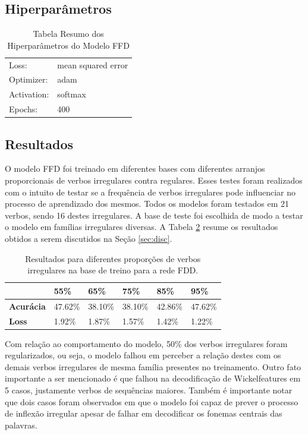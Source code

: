 \subsection{Hiperparâmetros}

\begin{table}[H]
\centering
\begin{tabular}{ll}
Loss: & mean squared error \\
Optimizer: & adam \\
Activation: & softmax \\
Epochs: & 400 \\
\end{tabular}
\caption{Tabela Resumo dos Hiperparâmetros do Modelo FFD}
\label{tab:resumo1}
\end{table}

\subsection{Resultados}

O modelo FFD foi treinado em diferentes bases com diferentes arranjos proporcionais de verbos irregulares contra regulares. Esses testes foram realizados com o intuito de testar se a frequência de verbos irregulares pode influenciar no processo de aprendizado dos mesmos. Todos os modelos foram testados em 21 verbos, sendo 16 destes irregulares. A base de teste foi escolhida de modo a testar o modelo em famílias irregulares diversas. A Tabela \ref{tab:resultadosfdd} resume os resultados obtidos a serem discutidos na Seção \ref{sec:disc}.

\begin{table}[H]
\centering
\begin{tabular}{llllll}
 & \textbf{55\%} & \textbf{65\%} & \textbf{75\%} & \textbf{85\%} & \textbf{95\%} \\ \hline
\textbf{Acurácia} & 47.62\% & 38.10\% & 38.10\% & 42.86\% & 47.62\% \\
\textbf{Loss} & 1.92\% & 1.87\% & 1.57\% & 1.42\% & 1.22\%
\end{tabular}
\caption{Resultados para diferentes proporções de verbos irregulares na base de treino para a rede FDD.}
\label{tab:resultadosfdd}
\end{table}

Com relação ao comportamento do modelo, 50\% dos verbos irregulares foram regularizados, ou seja, o modelo falhou em perceber a relação destes com os demais verbos irregulares de mesma família presentes no treinamento. Outro fato importante a ser mencionado é que falhou na decodificação de Wickelfeatures em 5 casos, justamente verbos de sequências maiores. Também é importante notar que dois casos foram observados em que o modelo foi capaz de prever o processo de inflexão irregular apesar de falhar em decodificar os fonemas centrais das palavras.

